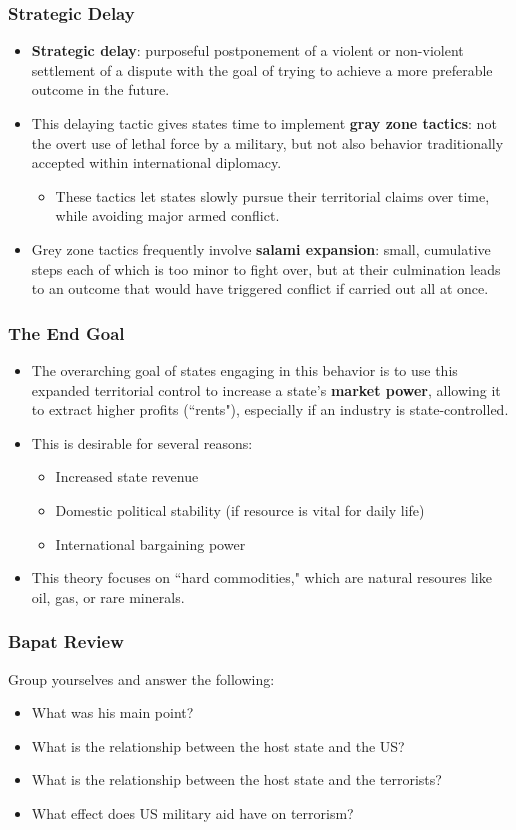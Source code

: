 \documentclass[handout]{beamer}
\begin{document}
\begin{frame} 
	\frametitle{\LARGE{Strategic Delay}}
	\begin{itemize}
		\item \textbf{Strategic delay}: purposeful postponement of a violent or non-violent settlement of a dispute  with the goal of trying to achieve a more preferable outcome in the future. \pause
		\item This delaying tactic gives states time to implement \textbf{gray zone tactics}: not the overt use of lethal  force by a military, but not also behavior traditionally accepted within international diplomacy. \pause
		\begin{itemize}
			\item These tactics let states slowly pursue their territorial claims over time, while avoiding major armed conflict. \pause
		\end{itemize}	
		\item Grey zone tactics frequently involve \textbf{salami expansion}: small, cumulative steps each of which is too minor to fight over, but at their culmination leads to an outcome that would have triggered conflict if carried out all at once. 
	\end{itemize}
\end{frame}

\begin{frame} 
	\frametitle{\LARGE{The End Goal}}
	\begin{itemize}
		\item The overarching goal of states engaging in this behavior is to use this expanded territorial control to increase a state's \textbf{market power}, allowing it to extract higher profits (``rents"), especially if an industry is state-controlled. \pause
		\item This is desirable for several reasons:
		\begin{itemize}
			\item Increased state revenue
			\item Domestic political stability (if resource is vital for daily life)
			\item International bargaining power
		\end{itemize}
		\item This theory focuses on ``hard commodities," which are natural resoures like oil, gas, or rare minerals.	
	\end{itemize}
\end{frame}

\begin{frame} 
	\frametitle{\LARGE{Bapat Review}}
	Group yourselves and answer the following:
	\begin{itemize}
		\item What was his main point?
		\item What is the relationship between the host state and the US?
		\item What is the relationship between the host state and the terrorists?
		\item What effect does US military aid have on terrorism?
	\end{itemize}
\end{frame}
\end{document}
